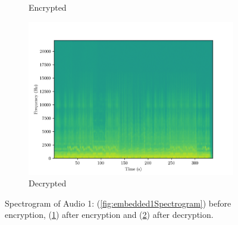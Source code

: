 \documentclass[a4paper]{cas-sc}
\begin{document}
\begin{figure}[pos=h]
\begin{subfigure}[h]{0.3\textwidth}
\begin{center}
            \caption{Encrypted}
            \label{fig:encrypted1Spectrogram}
        \end{center}
    \end{subfigure}
    \begin{subfigure}[h]{0.3\textwidth}
        \begin{center}
            \includegraphics[width=\textwidth]{decrypted1Spectrogram.png}
            \caption{Decrypted}
            \label{fig:decrypted1Spectrogram}
        \end{center}
    \end{subfigure}
    \caption{Spectrogram of Audio 1: (\ref{fig:embedded1Spectrogram}) before encryption, (\ref{fig:encrypted1Spectrogram}) after encryption and (\ref{fig:decrypted1Spectrogram}) after decryption.}
    \label{fig:audio1Spectrogram}
\end{figure}
\end{document}
